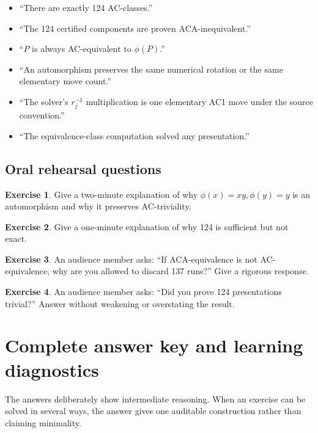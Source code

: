 \documentclass[11pt]{article}
\theoremstyle{definition}
\newtheorem{exercise}{Exercise}[section]
\theoremstyle{remark}
\begin{document}
\begin{itemize}
  \item ``There are exactly 124 AC-classes.''
  \item ``The 124 certified components are proven ACA-inequivalent.''
  \item ``\(P\) is always AC-equivalent to \(\phi(P)\).''
  \item ``An automorphism preserves the same numerical rotation or the
  same elementary move count.''
  \item ``The solver's \(r_j^{-1}\) multiplication is one elementary AC1
  move under the source convention.''
  \item ``The equivalence-class computation solved any presentation.''
\end{itemize}

\subsection{Oral rehearsal questions}

\begin{exercise}
Give a two-minute explanation of why \(\phi(x)=xy,\phi(y)=y\) is an
automorphism and why it preserves AC-triviality.
\end{exercise}

\begin{exercise}
Give a one-minute explanation of why 124 is sufficient but not exact.
\end{exercise}

\begin{exercise}
An audience member asks: ``If ACA-equivalence is not AC-equivalence, why
are you allowed to discard 137 runs?''  Give a rigorous response.
\end{exercise}

\begin{exercise}
An audience member asks: ``Did you prove 124 presentations trivial?''
Answer without weakening or overstating the result.
\end{exercise}

\newpage
\section{Complete answer key and learning diagnostics}
\label{sec:answers}

The answers deliberately show intermediate reasoning.  When an exercise can
be solved in several ways, the answer gives one auditable construction rather
than claiming minimality.
\end{document}
